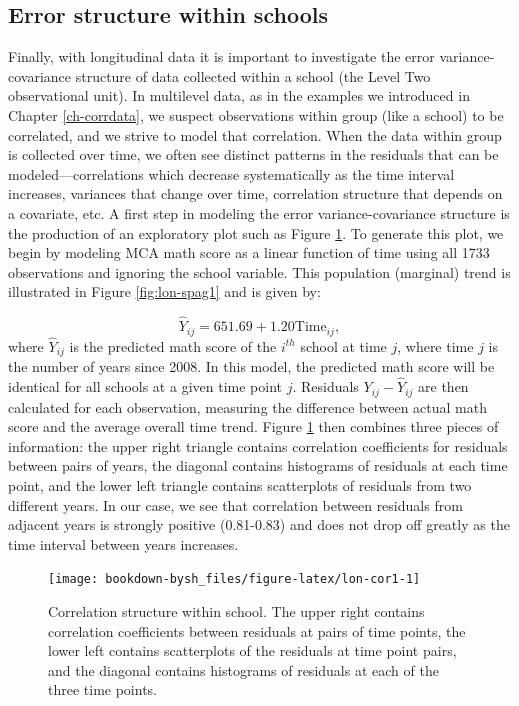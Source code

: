 \documentclass[
]{krantz}
\begin{document}
\hypertarget{lineartwostageerror2}{%
\subsection{Error structure within schools}\label{lineartwostageerror2}}

Finally, with longitudinal data it is important to investigate the error variance-covariance structure of data collected within a school (the Level Two observational unit). In multilevel data, as in the examples we introduced in Chapter \ref{ch-corrdata}, we suspect observations within group (like a school) to be correlated, and we strive to model that correlation. When the data within group is collected over time, we often see distinct patterns in the residuals that can be modeled---correlations which decrease systematically as the time interval increases, variances that change over time, correlation structure that depends on a covariate, etc. A first step in modeling the error variance-covariance structure is the production of an exploratory plot such as Figure \ref{fig:lon-cor1}. To generate this plot, we begin by modeling MCA math score as a linear function of time using all 1733 observations and ignoring the school variable. This population (marginal) trend is illustrated in Figure \ref{fig:lon-spag1} and is given by:

\begin{equation*}
\hat{Y}_{ij}=651.69+1.20\textrm{Time}_{ij},
\end{equation*}
where \(\hat{Y}_{ij}\) is the predicted math score of the \(i^{th}\) school at time \(j\), where time \(j\) is the number of years since 2008. In this model, the predicted math score will be identical for all schools at a given time point \(j\). Residuals \(Y_{ij}-\hat{Y}_{ij}\) are then calculated for each observation, measuring the difference between actual math score and the average overall time trend. Figure \ref{fig:lon-cor1} then combines three pieces of information: the upper right triangle contains correlation coefficients for residuals between pairs of years, the diagonal contains histograms of residuals at each time point, and the lower left triangle contains scatterplots of residuals from two different years. In our case, we see that correlation between residuals from adjacent years is strongly positive (0.81-0.83) and does not drop off greatly as the time interval between years increases.

\begin{figure}

{\centering \texttt{[image: bookdown-bysh\_files/figure-latex/lon-cor1-1]} 

}

\caption{Correlation structure within school.  The upper right contains correlation coefficients between residuals at pairs of time points, the lower left contains scatterplots of the residuals at time point pairs, and the diagonal contains histograms of residuals at each of the three time points.}\label{fig:lon-cor1}
\end{figure}
\end{document}

